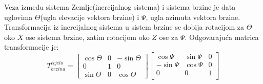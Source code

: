 Veza između sistema Zemlje(inercijalnog sistema) i sistema brzine je data uglovima $\Theta$(ugla elevacije vektora brzine)
i $\Psi$, ugla azimuta vektora brzine. Transformacija iz inercijalnog sistema u sistem brzine se dobija rotacijom 
za $\Theta$ oko $X$ ose sistema brzine, zatim rotacijom oko $Z$ ose za $\Psi$. Odgovarajuća matrica transformacije je:
\begin{equation}
    T_{brzina}^{tijelo} = \begin{bmatrix}
        \cos\Theta & 0 & -\sin\Theta \\
        0& 1& 0\\
        \sin\Theta & 0 & \cos\Theta
    \end{bmatrix}
    \begin{bmatrix}
        \cos\Psi & \sin\Psi & 0\\
        -\sin\Psi & \cos\Psi & 0\\
        0 & 0& 1\\
    \end{bmatrix}
\end{equation}
